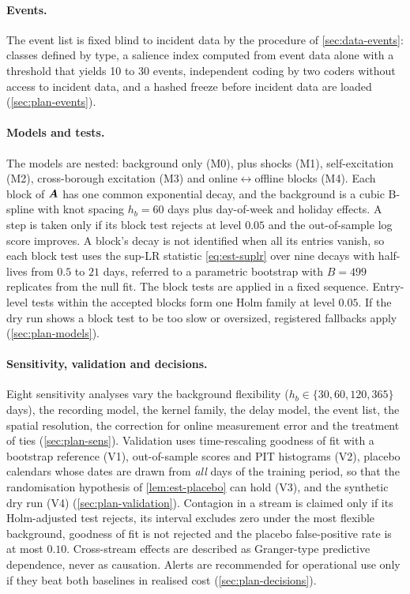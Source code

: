 \paragraph{Events.} The event list is fixed blind to incident data by the procedure of
\cref{sec:data-events}: classes defined by type, a salience index computed from event data
alone with a threshold that yields 10 to 30 events, independent coding by two coders without
access to incident data, and a hashed freeze before incident data are loaded
(\cref{sec:plan-events}).

\paragraph{Models and tests.} The models are nested: background only (M0), plus shocks
(M1), self-excitation (M2), cross-borough excitation (M3) and online$\leftrightarrow$offline
blocks (M4). Each block of $\bm{A}$ has one common exponential decay, and the background is a
cubic B-spline with knot spacing $h_b=60$ days plus day-of-week and holiday effects. A step
is taken only if its block test rejects at level $0.05$ and the out-of-sample log score
improves. A block's decay is not identified when all its entries vanish, so each block test
uses the sup-LR statistic \eqref{eq:est-suplr} over nine decays with half-lives from $0.5$
to $21$ days, referred to a parametric bootstrap with $B=499$ replicates from the null fit.
The block tests are applied in a fixed sequence. Entry-level tests within the accepted
blocks form one Holm family at level $0.05$. If the dry run shows a block test to be too
slow or oversized, registered fallbacks apply (\cref{sec:plan-models}).

\paragraph{Sensitivity, validation and decisions.} Eight sensitivity analyses vary the
background flexibility ($h_b\in\{30,60,120,365\}$ days), the recording model, the kernel
family, the delay model, the event list, the spatial resolution, the correction for online
measurement error and the treatment of ties (\cref{sec:plan-sens}). Validation uses
time-rescaling goodness of fit with a bootstrap reference (V1), out-of-sample scores and PIT
histograms (V2), placebo calendars whose dates are drawn from \emph{all} days of the
training period, so that the randomisation hypothesis of \cref{lem:est-placebo} can hold
(V3), and the synthetic dry run (V4) (\cref{sec:plan-validation}). Contagion in a stream is
claimed only if its Holm-adjusted test rejects, its interval excludes zero under the most
flexible background, goodness of fit is not rejected and the placebo false-positive rate is
at most $0.10$. Cross-stream effects are described as Granger-type predictive dependence,
never as causation. Alerts are recommended for operational use only if they beat both
baselines in realised cost (\cref{sec:plan-decisions}).
